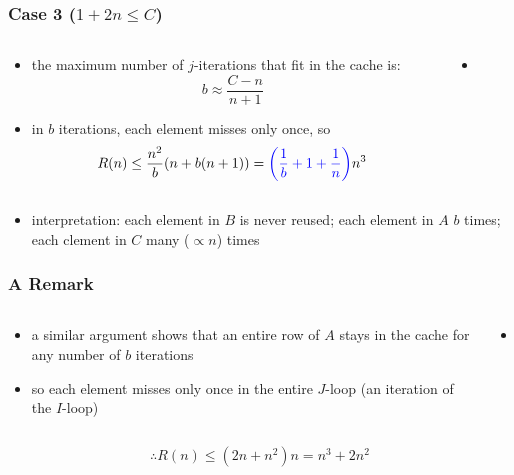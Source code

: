 \documentclass[12pt,dvipdfmx]{beamer}
\newcommand{\ao}[1]{{\color{blue}#1}}
\begin{document}
\begin{frame}
\frametitle{Case 3 ($1 + 2n \leq C$)}
\begin{columns}
  \begin{column}{0.5\textwidth}
\begin{itemize}
\item the maximum number of $j$-iterations
  that fit in the cache is:
\[ b \approx \frac{C - n}{n + 1} \]
\item in $b$ iterations, each element misses only once, so
\[ R(n) \leq \frac{n^2}{b} (n + b(n + 1))
= \ao{\left(\frac{1}{b} + 1 + \frac{1}{n} \right)} n^3
\]
\end{itemize}
  \end{column}

  \begin{column}{0.5\textwidth}
    \begin{itemize}
    \item []
{\tiny\def\svgwidth{0.9\textwidth}}
\end{itemize}
\end{column}
\end{columns}

\begin{itemize}
\item []
\ao{interpretation:} each element in $B$ is never reused; 
each element in $A$ $b$ times; 
each clement in $C$ many ($\propto n$) times 
\end{itemize}
\end{frame}

\begin{frame}
\frametitle{A Remark}
\begin{columns}
  \begin{column}{0.5\textwidth}
\begin{itemize}
\item a similar argument shows that an entire row of $A$ stays in the cache
  for any number of $b$ iterations
\item so each element misses only once in the entire $J$-loop (an iteration of the $I$-loop)
\end{itemize}
  \end{column}

  \begin{column}{0.5\textwidth}
    \begin{itemize}
    \item []
{\tiny\def\svgwidth{0.9\textwidth}}
\end{itemize}
\end{column}
\end{columns}
  \[ \therefore R(n) \leq (2n + n^2) n = n^3 + 2n^2 \]
\end{frame}
\end{document}
